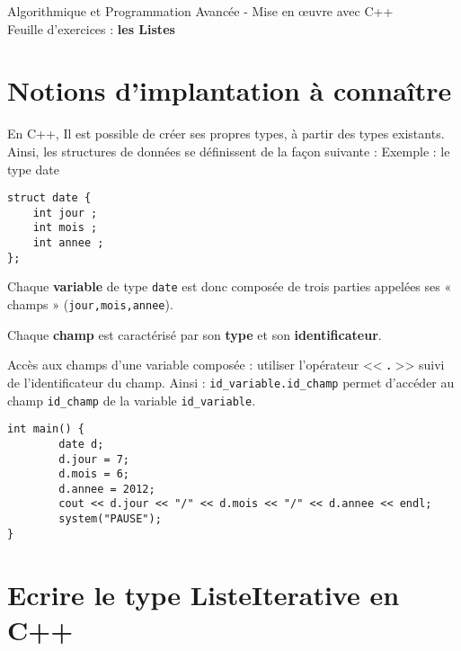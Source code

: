 \documentclass[french]{article}
\begin{document}
	
	\begin{minipage}{\textwidth}
\begin{center}

{\Large Algorithmique et Programmation Avancée - Mise en œuvre avec C++ \\ Feuille d'exercices : \textbf{les Listes}}
\end{center}
	\end{minipage}
	
	\section*{Notions d'implantation à connaître}
	En C++, Il est possible de créer ses propres types, à partir des types existants.
	Ainsi, les structures de données se définissent de la façon suivante :
	Exemple : le type date
	
	\begin{lstlisting}[caption={le type \textbf{date}}]
struct date {
	int jour ; 
	int mois ; 
	int annee ;
};
	\end{lstlisting}
	
	Chaque \textbf{variable} de type \texttt{date} est donc composée de trois parties appelées ses « champs » (\texttt{jour,mois,annee}). 
	
	Chaque \textbf{champ} est caractérisé par son \textbf{type} et son \textbf{identificateur}.
	
	Accès aux champs d'une variable composée : utiliser l’opérateur << \textbf{.} >> suivi de l’identificateur du champ. Ainsi : \texttt{id\_variable.id\_champ} permet d’accéder au champ \texttt{id\_champ} de la variable \texttt{id\_variable}.
	
	\begin{lstlisting}[caption={Utilisation du type date}]
int main() {
    	date d;
    	d.jour = 7;
    	d.mois = 6;
    	d.annee = 2012;
    	cout << d.jour << "/" << d.mois << "/" << d.annee << endl;
    	system("PAUSE");
}
	\end{lstlisting}
	
	\section{Ecrire le type ListeIterative en C++}
\end{document}
